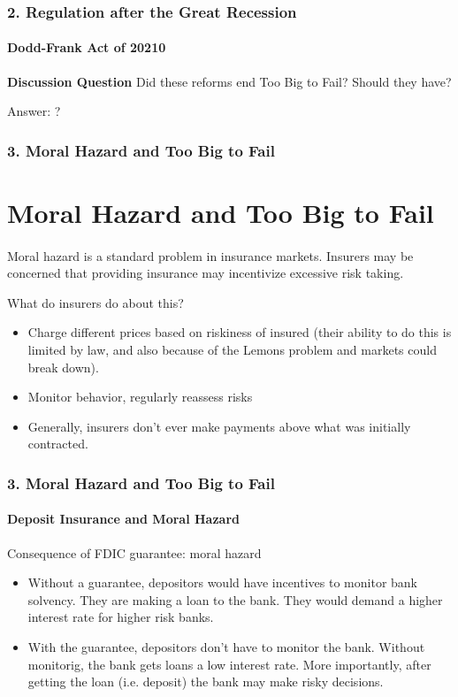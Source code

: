 \documentclass{beamer}
\begin{document}
\begin{frame}[t]
\frametitle{2. Regulation after the Great Recession}
\framesubtitle{Dodd-Frank Act of 20210}

\textbf{Discussion Question} Did these reforms end Too Big to Fail?   Should they have?
\vspace{1em}

Answer: ?

\end{frame}

\begin{frame}[t]
\frametitle{3. Moral Hazard and Too Big to Fail}
\section{Moral Hazard and Too Big to Fail}
\framesubtitle{}

    Moral hazard is a standard problem in insurance markets.   Insurers may be concerned that providing insurance may incentivize excessive risk taking.
    \vspace{1em}
    
    What do insurers do about this?
    
    \begin{itemize}
        \item Charge different prices based on riskiness of insured (their ability to do this is limited by law, and also because of the Lemons problem and markets could break down).
        \item Monitor behavior, regularly reassess risks
        \item Generally, insurers don’t ever make payments above what was initially contracted.
    \end{itemize}

\end{frame}

\begin{frame}[t]
\frametitle{3. Moral Hazard and Too Big to Fail}
\framesubtitle{Deposit Insurance and Moral Hazard}

Consequence of FDIC guarantee: moral hazard
\vspace{1em}

    \begin{itemize}
        \item Without a guarantee, depositors would have incentives to monitor bank solvency.   They are making a loan to the bank.  They would demand a higher interest rate for higher risk banks.
    
        \item With the guarantee, depositors don’t have to monitor the bank.  Without monitorig, the bank gets loans a low interest rate.   More importantly, after getting the loan (i.e. deposit) the bank may make risky decisions.
    \end{itemize}
    
\end{frame}
\end{document}
